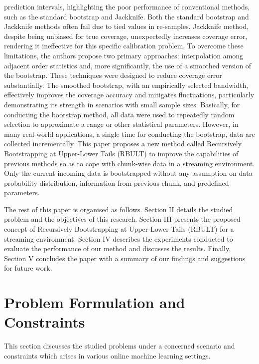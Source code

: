 \documentclass[a4paper,fleqn]{cas-dc}
\begin{document}
prediction intervals, highlighting the poor performance of conventional methods, such as the standard 
bootstrap and Jackknife. Both the standard bootstrap and Jackknife methods often fail due to tied values in 
re-samples. Jackknife method, despite being unbiased for true coverage, unexpectedly increases 
coverage error, rendering it ineffective for this specific calibration problem. To overcome these 
limitations, the authors propose two primary approaches: interpolation among adjacent order statistics 
and, more significantly, the use of a smoothed version of the bootstrap. These techniques were designed 
to reduce coverage error substantially. The smoothed bootstrap, with an empirically selected bandwidth, 
effectively improves the coverage accuracy and mitigates fluctuations, particularly demonstrating its 
strength in scenarios with small sample sizes. Basically, for conducting the bootstrap method, all 
data were used to repeatedly random selection to approximate a range or other statistical parameters. 
However, in many real-world applications, a single time for conducting the bootstrap, 
data are collected incrementally. This paper proposes a new method called Recursively Bootstrapping at 
Upper-Lower Tails (RBULT) to improve the capabilities of previous methods so as to cope with chunk-wise 
data in a streaming environment. Only the current incoming data is bootstrapped without any assumption on 
data probability distribution, information from previous chunk, and predefined parameters.

The rest of this paper is organised as follows. Section II details the studied problem 
and the objectives of this research. Section III presents the proposed concept of Recursively Bootstrapping 
at Upper-Lower Tails (RBULT) for a streaming environment. Section IV describes the experiments conducted 
to evaluate the performance of our method and discusses the results. Finally, Section V concludes the 
paper with a summary of our findings and suggestions for future work.

\section{Problem Formulation and Constraints}
This section discusses the studied problems under a concerned scenario and constraints which arises in
various online machine learning settings.
  
\end{document}

